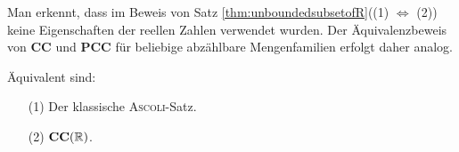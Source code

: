 \begin{bem}
  Man erkennt, dass im Beweis von Satz \ref{thm:unboundedsubsetofR}((1) $\Leftrightarrow$ (2)) keine Eigenschaften der reellen Zahlen verwendet wurden. Der Äquivalenzbeweis von $\mathbf{CC}$ und $\mathbf{PCC}$ für beliebige abzählbare Mengenfamilien erfolgt daher analog.
\end{bem}

\begin{thm}
  \label{thm:classicalascoli}
  Äquivalent sind:
  \begin{enumerate}
    \item[(1)] Der klassische \textsc{Ascoli}-Satz.
    \item[(2)] $\mathbf{CC}(\mathbb{R})$.
  \end{enumerate}
\end{thm}

